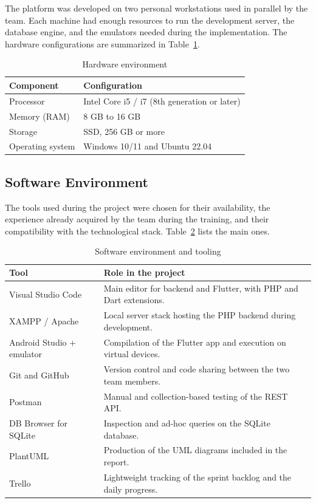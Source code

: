 The platform was developed on two personal workstations used in parallel by the team. Each machine had enough resources to run the development server, the database engine, and the emulators needed during the implementation. The hardware configurations are summarized in Table~\ref{tab:hw_env}.

\begin{table}[H]
\centering
\caption{Hardware environment}
\label{tab:hw_env}
\begin{tabular}{|l|p{9cm}|}
\hline
\textbf{Component}     & \textbf{Configuration} \\
\hline
Processor              & Intel Core i5 / i7 (8th generation or later) \\
\hline
Memory (RAM)           & 8 GB to 16 GB \\
\hline
Storage                & SSD, 256 GB or more \\
\hline
Operating system       & Windows 10/11 and Ubuntu 22.04 \\
\hline
\end{tabular}
\end{table}

\subsection{Software Environment}

The tools used during the project were chosen for their availability, the experience already acquired by the team during the training, and their compatibility with the technological stack. Table~\ref{tab:sw_env} lists the main ones.

\begin{table}[H]
\centering
\caption{Software environment and tooling}
\label{tab:sw_env}
\begin{tabular}{|l|p{9.5cm}|}
\hline
\textbf{Tool} & \textbf{Role in the project} \\
\hline
Visual Studio Code & Main editor for backend and Flutter, with PHP and Dart extensions. \\
\hline
XAMPP / Apache & Local server stack hosting the PHP backend during development. \\
\hline
Android Studio + emulator & Compilation of the Flutter app and execution on virtual devices. \\
\hline
Git and GitHub & Version control and code sharing between the two team members. \\
\hline
Postman & Manual and collection-based testing of the REST API. \\
\hline
DB Browser for SQLite & Inspection and ad-hoc queries on the SQLite database. \\
\hline
PlantUML & Production of the UML diagrams included in the report. \\
\hline
Trello & Lightweight tracking of the sprint backlog and the daily progress. \\
\hline
\end{tabular}
\end{table}

